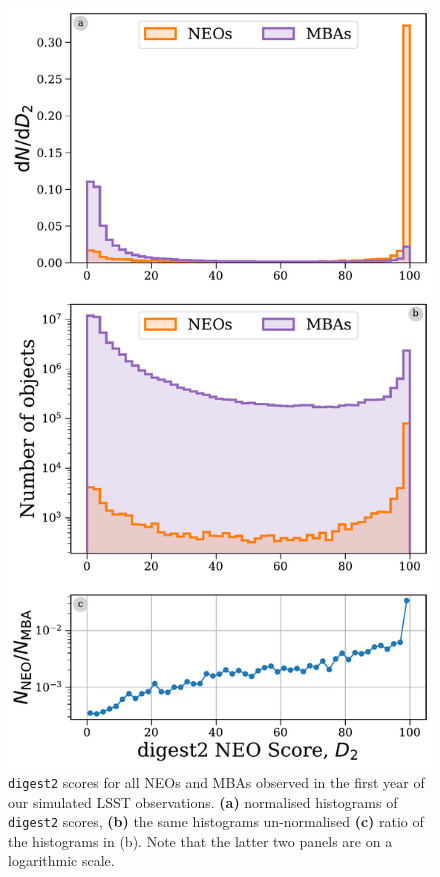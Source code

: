 \documentclass[twocolumn]{aastex631}
\newcommand{\dig}{\texttt{digest2}}
\begin{document}
\begin{figure}[b]
    \centering
    \includegraphics[width=\columnwidth]{digest2_pollution.pdf}
    \caption{\dig{} scores for all NEOs and MBAs observed in the first year of our simulated LSST observations. \textbf{(a)} normalised histograms of \dig{} scores, \textbf{(b)} the same histograms un-normalised \textbf{(c)} ratio of the histograms in (b). Note that the latter two panels are on a logarithmic scale.}
    \label{fig:digest2_example}
\end{figure}
\end{document}
